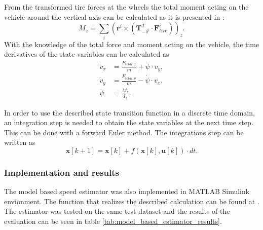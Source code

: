 From the transformed tire forces at the wheels the total moment acting on the vehicle around the vertical axis can be calculated as it is presented in \cite{Rajesh_Vehicle_Dynamics}:
\begin{equation}
    M_z = \sum_{i} (\mathbf{r}^i \times (\mathbf{T}_{-\delta^i}^T \cdot \mathbf{F}_{tire}^i))_z.
\end{equation}
With the knowledge of the total force and moment acting on the vehicle, the time derivatives of the state variables can be calculated as
\begin{align}
    \dot{v}_x &= \frac{F_{total,x}}{m} + \dot \psi \cdot v_y, \\
    \dot{v}_y &= \frac{F_{total,y}}{m} - \dot \psi \cdot v_x, \\
    \ddot{\psi} &= \frac{M_z}{I_z}.
\end{align}

In order to use the described state transition function in a discrete time domain, an integration step is needed to obtain the state variables at the next time step. This can be done with a forward Euler method. The integrations step can be written as
\begin{equation}
    \mathbf{x}[k+1] = \mathbf{x}[k] + f(\mathbf{x}[k], \mathbf{u}[k]) \cdot dt.
\end{equation}

\subsubsection{Implementation and results}

The model based speed estimator was also implemented in MATLAB Simulink envionment. The function that realizes the described calculation can be found at . The estimator was tested on the same test dataset and the results of the evaluation can be seen in table \ref{tab:model_based_estimator_results}.

